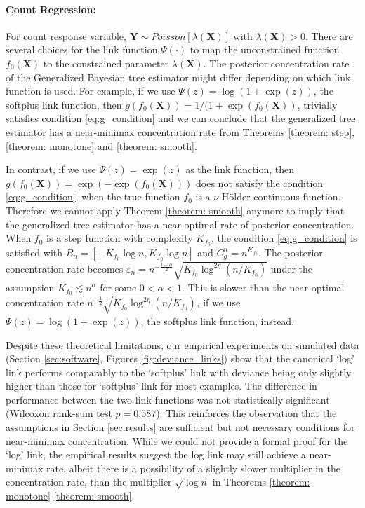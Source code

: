 \documentclass[12pt]{article}
\newcommand{\bm}[1]{\boldsymbol{#1}}
\newcommand{\Y}{\bm{Y}}
\newcommand{\1}{\mathbb{I}}
\def\Y{\bm{Y}}
\def\X{\bm{X}}
\def\X{\mbox{\boldmath$X$}}
\renewcommand{\Y}{\bm{Y}}
\def\X{\bm{X}}
\theoremstyle{plain}
\theoremstyle{definition}
\theoremstyle{remark}
\begin{document}
\paragraph{Count Regression:}
For count response variable, $\Y \sim Poisson \left[\lambda(\X) \right]$ with $\lambda(\X) > 0$. There are several choices for the link function $\Psi(\cdot)$ to map the unconstrained function $f_0(\X)$ to the constrained parameter $\lambda(\X)$. The posterior concentration rate of the Generalized Bayesian tree estimator might differ depending on which link function is used. For example, if we use $\Psi(z) = \log \left( 1 + \exp(z)\right)$, the softplus link function, then $g(f_0(\X))= 1/(1 + \exp \left (f_0(\X) \right ) $, trivially satisfies condition \eqref{eq:g_condition} and we can conclude that the generalized tree estimator has a near-minimax concentration rate from Theorems \ref{theorem: step}, \ref{theorem: monotone} and \ref{theorem: smooth}.

In contrast, if we use $\Psi(z) = \exp(z)$ as the link function, then $g(f_0(\X))= \exp \left(-\exp(f_0(\X))\right)$ does not satisfy the condition \eqref{eq:g_condition}, when the true function $f_0$ is a $\nu$-H\"{o}lder continuous function. Therefore we cannot apply Theorem \ref{theorem: smooth} anymore to imply that the generalized tree estimator has a near-optimal rate of posterior concentration. When $f_0$ is a step function with complexity $K_{f_0}$, the condition \eqref{eq:g_condition} is satisfied with $B_n=[-K_{f_0}\log n,K_{f_0}\log n]$ and $C_g^n=n^{K_{f_0}}$. The posterior concentration rate becomes $\varepsilon_n=n^{-\frac{1-\alpha}{2}}\sqrt{K_{f_0} \log^{2\eta}(n/ K_{f_0})}$ under the assumption $K_{f_0} \lesssim n^{\alpha}$ for some $0< \alpha < 1$. This is slower than the near-optimal concentration rate $n^{-\frac{1}{2}}\sqrt{K_{f_0}\log^{2\eta}(n/K_{f_0})}$, if we use $\Psi(z) = \log \left( 1 + \exp(z)\right)$, the softplus link function, instead.

Despite these theoretical limitations, our empirical experiments on simulated data (Section \ref{sec:software}, Figures \ref{fig:deviance_links}) show that the canonical `log' link performs comparably to the `softplus' link with deviance being only slightly higher than those for `softplus' link for most examples. The difference in performance between the two link functions was not statistically significant (Wilcoxon rank-sum test $p=0.587$). This reinforces the observation that the assumptions in Section \ref{sec:results} are sufficient but not necessary conditions for near-minimax concentration. While we could not provide a formal proof for the `log' link, the empirical results suggest the log link may still achieve a near-minimax rate, albeit there is a possibility of a slightly slower multiplier in the concentration rate, than the multiplier $\sqrt{\log {n}}$ in Theorems \ref{theorem: monotone}-\ref{theorem: smooth}.
\end{document}
